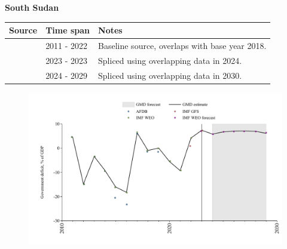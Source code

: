 \documentclass[12pt,a4paper,landscape]{article}
\begin{document}
\begin{adjustbox}{max totalsize={\paperwidth}{\paperheight},center}
\begin{minipage}[t][\textheight][t]{\textwidth}
\vspace*{0.5cm}
{}
\begin{center}
{\Large\bfseries South Sudan}
\end{center}
\vspace{0.5cm}
\begin{table}[H]
\centering
\small
\begin{tabular}{|l|l|l|}
\hline
\textbf{Source} & \textbf{Time span} & \textbf{Notes} \\
\hline
\rowcolor{white}\cite{IMF_WEO}& 2011 - 2022 &Baseline source, overlaps with base year 2018.\\
\rowcolor{lightgray}\cite{IMF_GFS}& 2023 - 2023 &Spliced using overlapping data in 2024.\\
\rowcolor{white}\cite{IMF_WEO_forecast}& 2024 - 2029 &Spliced using overlapping data in 2030.\\
\hline
\end{tabular}
\end{table}
\begin{figure}[H]
\centering
\includegraphics[width=\textwidth,height=0.6\textheight,keepaspectratio]{graphs/SSD_govdef_GDP.pdf}
\end{figure}
\end{minipage}
\end{adjustbox}
\end{document}

